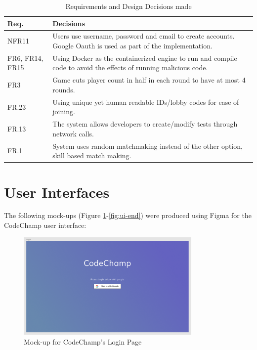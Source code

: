 \documentclass[12pt, titlepage]{article}
\begin{document}
\begin{table}[H]
\centering 
\begin{tabular}{p{} p{}}
\toprule
\textbf{Req.} & \textbf{Decisions}\\
\midrule
NFR11 & Users use username, password and email to create accounts. Google Oauth is used as part of the implementation.\\ 
FR6, FR14, FR15 & Using Docker as the containerized engine to run and compile code to avoid the effects of running malicious code.\\
FR3 & Game cuts player count in half in each round to have at most 4 rounds.\\
FR.23 & Using unique yet human readable IDs/lobby codes for ease of joining. \\
FR.13 & The system allows developers to create/modify tests through network calls. \\
FR.1 & System uses random matchmaking instead of the other option, skill based match making. \\
\hline
\end{tabular}
\caption{Requirements and Design Decisions made}
\label{TblRT2}
\end{table}


\section{User Interfaces}

The following mock-ups (Figure \ref{fig:ui-start}-\ref{fig:ui-end}) were produced using Figma for the CodeChamp user interface: 

\begin{figure}[H]
\centering
\includegraphics[width=0.8\textwidth]{Design/SystDesign/LoginPage.png}
\caption{Mock-up for CodeChamp's Login Page}\label{fig:ui-start}
\end{figure}
\end{document}
